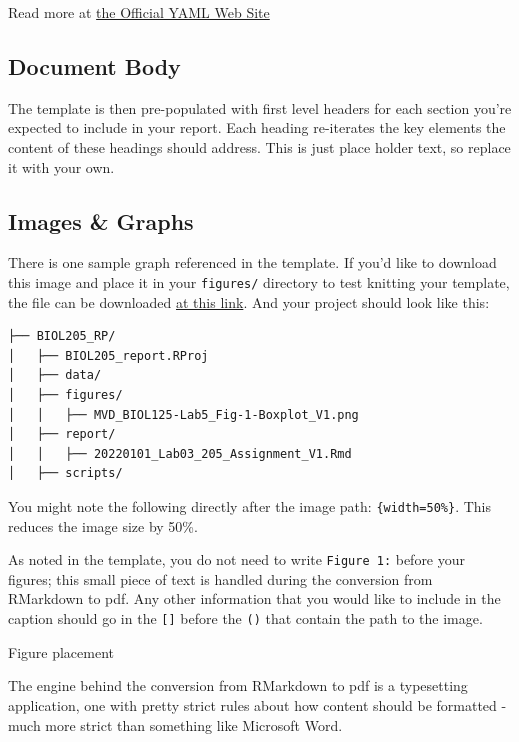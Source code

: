 \documentclass[
]{book}
\begin{document}
Read more at \href{https://yaml.org/}{the Official YAML Web Site}

\hypertarget{document-body}{%
\subsection*{Document Body}\label{document-body}}

The template is then pre-populated with first level headers for each section you're expected to include in your report. Each heading re-iterates the key elements the content of these headings should address. This is just place holder text, so replace it with your own.

\hypertarget{images-graphs}{%
\subsection*{Images \& Graphs}\label{images-graphs}}

There is one sample graph referenced in the template. If you'd like to download this image and place it in your \texttt{figures/} directory to test knitting your template, the file can be downloaded \href{https://osf.io/download/nrzdu}{at this link}. And your project should look like this:

\begin{verbatim}
├── BIOL205_RP/
│   ├── BIOL205_report.RProj
│   ├── data/
│   ├── figures/
│   │   ├── MVD_BIOL125-Lab5_Fig-1-Boxplot_V1.png
│   ├── report/
│   │   ├── 20220101_Lab03_205_Assignment_V1.Rmd
│   ├── scripts/
\end{verbatim}

You might note the following directly after the image path: \texttt{\{width=50\%\}}. This reduces the image size by 50\%.

As noted in the template, you do not need to write \texttt{Figure\ 1:} before your figures; this small piece of text is handled during the conversion from RMarkdown to pdf. Any other information that you would like to include in the caption should go in the \texttt{{[}{]}} before the \texttt{()} that contain the path to the image.

Figure placement

The engine behind the conversion from RMarkdown to pdf is a typesetting application, one with pretty strict rules about how content should be formatted - much more strict than something like Microsoft Word.
\end{document}
